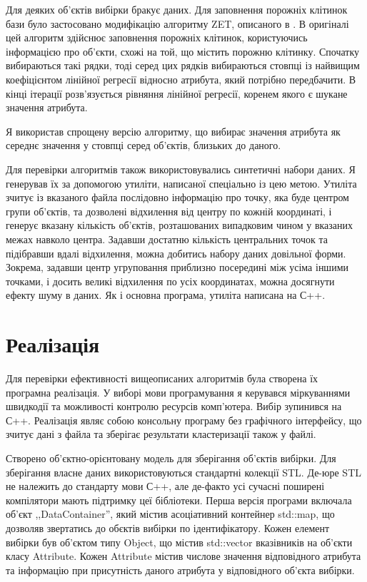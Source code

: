         Для деяких об'єктів вибірки бракує даних. Для заповнення порожніх клітинок бази було застосовано модифікацію алгоритму ZET, описаного в \cite{Zagorujko}. В оригіналі цей алгоритм здійснює заповнення порожніх клітинок, користуючись інформацією про об'єкти, схожі на той, що містить порожню клітинку. Спочатку вибираються такі рядки, тоді серед цих рядків вибираються стовпці із найвищим коефіцієнтом лінійної регресії відносно атрибута, який потрібно передбачити. В кінці ітерації розв'язується рівняння лінійної регресії, коренем якого є шукане значення атрибута.
        
        Я використав спрощену версію алгоритму, що вибирає значення атрибута як середнє значення у стовпці серед об'єктів, близьких до даного.
        
        Для перевірки алгоритмів також використовувались синтетичні набори даних. Я генерував їх за допомогою утиліти, написаної спеціально із цею метою. Утиліта зчитує із вказаного файла послідовно інформацію про точку, яка буде центром групи об'єктів, та дозволені відхилення від центру по кожній координаті, і генерує вказану кількість об'єктів, розташованих випадковим чином у вказаних межах навколо центра. Задавши достатню кількість центральних точок та підібравши вдалі відхилення, можна добитись набору даних довільної форми. Зокрема, задавши центр угруповання приблизно посередині між усіма іншими точками, і досить великі відхилення по усіх координатах, можна досягнути ефекту шуму в даних. Як і основна програма, утиліта написана на С++.
            
    \section {Реалізація}
        Для перевірки ефективності вищеописаних алгоритмів була створена їх програмна реалізація. У виборі мови програмування я керувався міркуваннями швидкодії та можливості контролю ресурсів комп'ютера. Вибір зупинився на С++. Реалізація являє собою консольну програму без графічного інтерфейсу, що зчитує дані з файла та зберігає результати кластеризації також у файлі.
        
        
        Створено об'єктно-орієнтовану модель для зберігання об'єктів вибірки. Для зберігання власне даних використовуються стандартні колекції STL. Де-юре STL не належить до стандарту мови С++, але де-факто усі сучасні поширені компілятори мають підтримку цеї бібліотеки. Перша версія програми включала об'єкт ,,DataContainer'', який містив асоціативний контейнер std::map, що дозволяв звертатись до обєктів вибірки по ідентифікатору. Кожен елемент вибірки був об'єктом типу Object, що містив std::vector вказівників на об'єкти класу Attribute. Кожен Attribute містив числове значення відповідного атрибута та інформацію при присутність даного атрибута у відповідного об'єкта вибірки.
        
